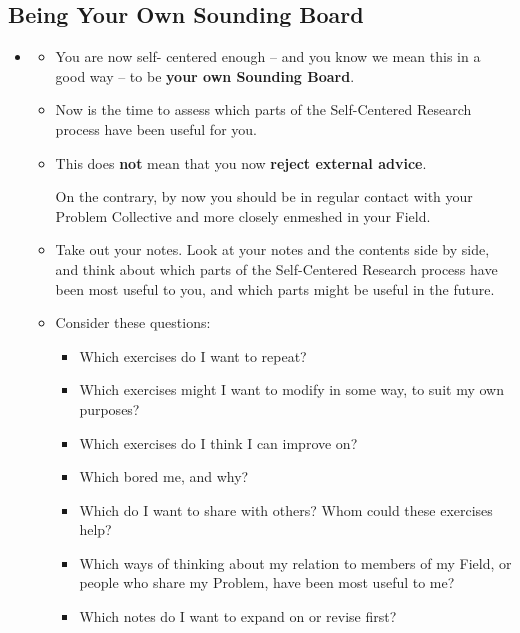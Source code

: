 \documentclass[11pt]{article}
\begin{document}
\subsection{Being Your Own Sounding Board}
\begin{itemize}
\item \begin{exercise}
\begin{itemize}
\item You are now self- centered enough -- and you know we mean this in a good way -- to be \textbf{your own Sounding Board}.

\item  Now is the time to assess which parts of the Self-Centered Research process have been useful for you.

\item This does \textbf{not} mean that you now \textbf{reject external advice}. 

On the contrary, by now you should be in regular contact with your Problem Collective and more closely enmeshed in your Field.

\item Take out your notes. Look at your notes and the contents
side by side, and think about which parts of the Self-Centered Research process have been most useful to you,
and which parts might be useful in the future.

\item Consider these questions:
\begin{itemize}
\item Which exercises do I want to repeat?
\item Which exercises might I want to modify in some way, to suit my own purposes?
\item  Which exercises do I think I can improve on?
\item  Which bored me, and why?
\item  Which do I want to share with others? Whom could these exercises help?
\item  Which ways of thinking about my relation to members of my Field, or people who share my Problem, have been most useful to me?
\item  Which notes do I want to expand on or revise first?
\end{itemize}
\end{itemize}

\end{exercise}
\end{itemize}
\newpage
\end{document}
